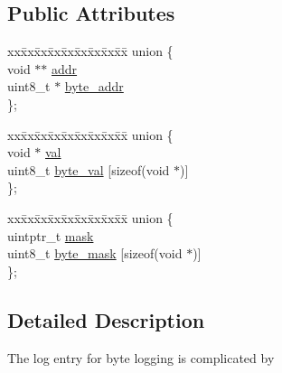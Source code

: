 \subsection*{Public Attributes}
\begin{DoxyCompactItemize}
\item 
\begin{tabbing}
xx\=xx\=xx\=xx\=xx\=xx\=xx\=xx\=xx\=\kill
union \{\\
\>void $\ast$$\ast$ \hyperlink{structstm_1_1ByteLoggingWriteSetEntry_aa3ecfa56c0fd3095755a31c95ff65fb8}{addr}\\
\>uint8\_t $\ast$ \hyperlink{structstm_1_1ByteLoggingWriteSetEntry_a6530d68791fa8f1b587e66f916fe8113}{byte\_addr}\\
\}; \\

\end{tabbing}\item 
\begin{tabbing}
xx\=xx\=xx\=xx\=xx\=xx\=xx\=xx\=xx\=\kill
union \{\\
\>void $\ast$ \hyperlink{structstm_1_1ByteLoggingWriteSetEntry_ae5246177179e5ec224f6af8d123980c2}{val}\\
\>uint8\_t \hyperlink{structstm_1_1ByteLoggingWriteSetEntry_a40f023cbd1895383090a36aed674c991}{byte\_val} \mbox{[}sizeof(void $\ast$)\mbox{]}\\
\}; \\

\end{tabbing}\item 
\begin{tabbing}
xx\=xx\=xx\=xx\=xx\=xx\=xx\=xx\=xx\=\kill
union \{\\
\>uintptr\_t \hyperlink{structstm_1_1ByteLoggingWriteSetEntry_a3bea52141880d7ff6f03c498ed7d0a47}{mask}\\
\>uint8\_t \hyperlink{structstm_1_1ByteLoggingWriteSetEntry_a569ce98c81a55ed39f2408bce9734bbf}{byte\_mask} \mbox{[}sizeof(void $\ast$)\mbox{]}\\
\}; \\

\end{tabbing}\end{DoxyCompactItemize}


\subsection{Detailed Description}
The log entry for byte logging is complicated by

